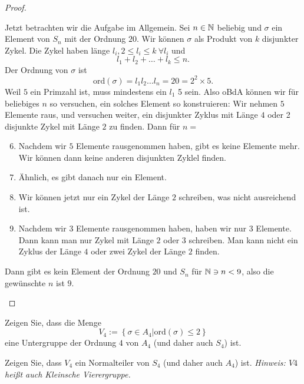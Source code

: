 \begin{proof}
\begin{parts}
		Jetzt betrachten wir die Aufgabe im Allgemein. Sei $n\in \mathbb{N}$ beliebig und $\sigma$ ein Element von $S_n$ mit der Ordnung $20$. Wir können $\sigma$ als Produkt von $k$ disjunkter Zykel. Die Zykel haben länge $l_i, 2\le l_i \le k~\forall l_i$ und
		\[
		l_1+l_2+\dots+l_k\le n
		.\] 
		Der Ordnung von $\sigma$ ist
		\[
			\text{ord}(\sigma)=l_1l_2\dots l_n=20=2^2\times 5
		.\] 
		Weil $5$ ein Primzahl ist, muss mindestens ein $l_1$ 5 sein. Also oBdA können wir f\"{u}r beliebiges $n$ so versuchen, ein solches Element so konstruieren: Wir nehmen $5$ Elemente raus, und versuchen weiter, ein disjunkter Zyklus mit Länge $4$ oder 2 disjunkte Zykel mit Länge $2$ zu finden. Dann f\"{u}r $n=$
		 \begin{enumerate}[label=(\arabic*)]
			 \setcounter{enumi}{5}
			 \item Nachdem wir $5$ Elemente rausgenommen haben, gibt es keine Elemente mehr. Wir können dann keine anderen disjunkten Zyklel finden.
			 \item Ähnlich, es gibt danach nur ein Element.
			 \item Wir können jetzt nur ein Zykel der Länge $2$ schreiben, was nicht ausreichend ist.
			 \item Nachdem wir $3$ Elemente rausgenommen haben, haben wir nur $3$ Elemente. Dann kann man nur Zykel mit Länge $2$ oder $3$ schreiben. Man kann nicht ein Zyklus der Länge $4$ oder zwei Zykel der Länge $2$ finden.
		\end{enumerate}
		Dann gibt es kein Element der Ordnung $20$ und $S_n$ f\"{u}r $\mathbb{N}\ni n<9$, also die gewünschte $n$ ist $9$.\qedhere
	\end{parts}
\end{proof}

\begin{Problem}
	\begin{parts}
	\item Zeigen Sie, dass die Menge
		\[
			V_4:=\left\{ \sigma\in A_4|\text{ord}(\sigma)\le 2 \right\} 
		\]
		eine Untergruppe der Ordnung $4$ von $A_4$ (und daher auch $S_4$) ist.
	\item Zeigen Sie, dass $V_4$ ein Normalteiler von $S_4$ (und daher auch $A_4$) ist.
		{\footnotesize \emph{Hinweis: $V4$ heißt auch Kleinsche Vierergruppe.}}
	\end{parts}
\end{Problem}
